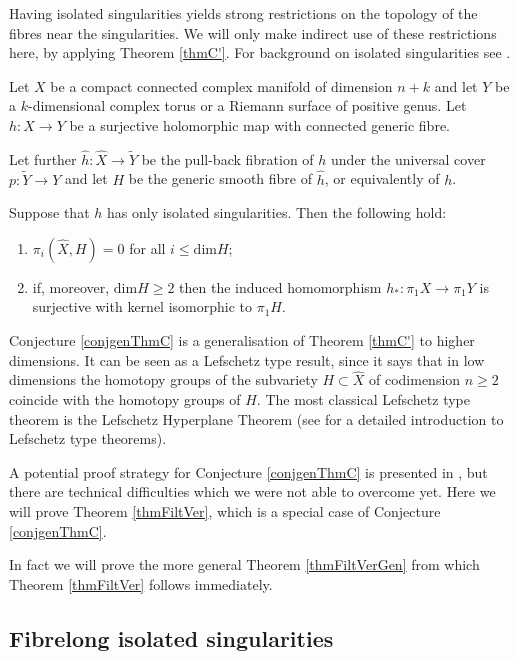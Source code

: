 Having isolated singularities yields strong restrictions on the topology of the fibres near the singularities. We will only make indirect use of these restrictions here, by applying Theorem \ref{thmC'}. For background on isolated singularities see \cite{Loo-84}.

\begin{conjecture}
Let $X$ be a compact connected complex manifold of dimension $n+k$ and let $Y$ be a $k$-dimensional complex torus or a Riemann surface of positive genus. Let $h: X\rightarrow Y$ be a surjective holomorphic map with connected generic fibre.

Let further $\widehat{h}:\widehat{X}\rightarrow \widetilde{Y}$ be the pull-back fibration of $h$ under the universal cover $p: \widetilde{Y}\rightarrow Y$ and let $H$ be the generic smooth fibre of $\widehat{h}$, or equivalently of $h$.

Suppose that $h$ has only isolated singularities. Then the following hold:
\begin{enumerate}
 \item $\pi_i(\widehat{X},H)=0$ for all $i\leq \mathrm{dim} H$;
 \item if, moreover, $\mathrm{dim} H\geq 2$ then the induced homomorphism $h_{\ast}: \pi_1 X\rightarrow \pi_1 Y$ is surjective with kernel isomorphic to $\pi_1 H$.
\end{enumerate}
\label{conjgenThmC}
\end{conjecture}

Conjecture \ref{conjgenThmC} is a generalisation of Theorem \ref{thmC'} to higher dimensions. It can be seen as a Lefschetz type result, since it says that in low dimensions the homotopy groups of the subvariety $H\subset \widehat{X}$ of codimension $n\geq 2$ coincide with the homotopy groups of $H$. The most classical Lefschetz type theorem is the Lefschetz Hyperplane Theorem (see \cite{GorMac-88} for a detailed introduction to Lefschetz type theorems). 

A potential proof strategy for Conjecture \ref{conjgenThmC} is presented in \cite{Llo-PhD}, but there are technical difficulties which we were not able to overcome yet. Here we will prove Theorem \ref{thmFiltVer}, which is a special case of Conjecture \ref{conjgenThmC}.


In fact we will prove the more general Theorem \ref{thmFiltVerGen} from which Theorem \ref{thmFiltVer} follows immediately. 

\subsection{Fibrelong isolated singularities}
\label{secFibrelongSingBriLlo}

